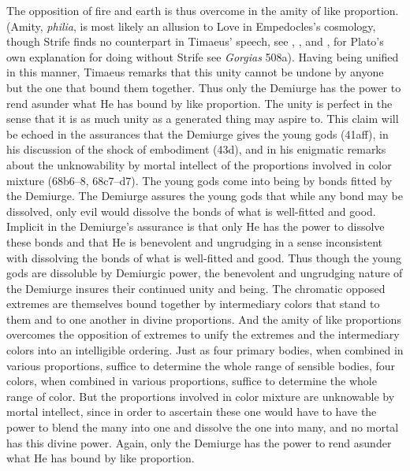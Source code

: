 The opposition of fire and earth is thus overcome in the amity of like proportion. (Amity, \emph{philia}, is most likely an allusion to Love in Empedocles's cosmology, though Strife finds no counterpart in Timaeus' speech, see \citealt[99--100]{Taylor:1928qb}, \citealt[44 n4]{Cornford:1935fk}, and \citealt[230 n119]{Broadie:2012vl}, for Plato's own explanation for doing without Strife see \emph{Gorgias} 508a). Having being unified in this manner, Timaeus remarks that this unity cannot be undone by anyone but the one that bound them together. Thus only the Demiurge has the power to rend asunder what He has bound by like proportion. The unity is perfect in the sense that it is as much unity as a generated thing may aspire to. This claim will be echoed in the assurances that the Demiurge gives the young gods (41aff), in his discussion of the shock of embodiment (43d), and in his enigmatic remarks about the unknowability by mortal intellect of the proportions involved in color mixture (68b6–8, 68c7–d7). The young gods come into being by bonds fitted by the Demiurge. The Demiurge assures the young gods that while any bond may be dissolved, only evil would dissolve the bonds of what is well-fitted and good. Implicit in the Demiurge's assurance is that only He has the power to dissolve these bonds and that He is benevolent and ungrudging in a sense inconsistent with dissolving the bonds of what is well-fitted and good. Thus though the young gods are dissoluble by Demiurgic power, the benevolent and ungrudging nature of the Demiurge insures their continued unity and being. The chromatic opposed extremes are themselves bound together by intermediary colors that stand to them and to one another in divine proportions. And the amity of like proportions overcomes the opposition of extremes to unify the extremes and the intermediary colors into an intelligible ordering. Just as four primary bodies, when combined in various proportions, suffice to determine the whole range of sensible bodies, four colors, when combined in various proportions, suffice to determine the whole range of color. But the proportions involved in color mixture are unknowable by mortal intellect, since in order to ascertain these one would have to have the power to blend the many into one and dissolve the one into many, and no mortal has this divine power. Again, only the Demiurge has the power to rend asunder what He has bound by like proportion.

